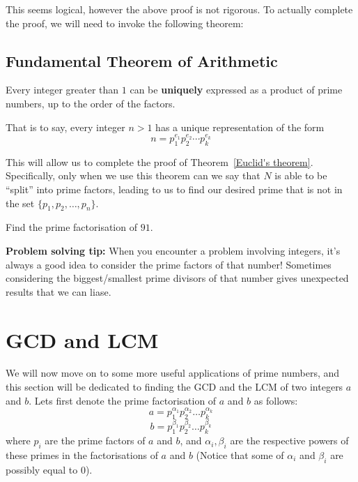 \documentclass{article}
\theoremstyle{mytheoremstyle}
\theoremstyle{mytheoremstyle}
\theoremstyle{myproblemstyle}
\theoremstyle{myproblemstyle}
\theoremstyle{myproblemstyle}
\begin{document}
    This seems logical, however the above proof is not rigorous. To actually complete the proof, we will need to invoke the following theorem:


    
    \subsection{Fundamental Theorem of Arithmetic}
    \begin{theorem}
        Every integer greater than $1$ can be \textbf{uniquely} expressed as a product of prime numbers, up to the order of the factors.
    \end{theorem}

    That is to say, every integer $n > 1$ has a unique representation of the form 
    \begin{equation*}
        n = p_1^{e_1} p_2^{e_2} \cdots p_k^{e_k}
    \end{equation*}

    This will allow us to complete the proof of Theorem~\ref{Euclid's theorem}. Specifically, only when we use this theorem can we say that $N$ is able to be ``split'' into prime factors, leading to us to find our desired prime that is not in the set $\{p_1, p_2, \ldots, p_n\}$.

    \begin{exercise}
        Find the prime factorisation of $91$. 
    \end{exercise}

    \textbf{Problem solving tip:} When you encounter a problem involving integers, it's always a good idea to consider the prime factors of that number! Sometimes considering the biggest/smallest prime divisors of that number gives unexpected results that we can liase.

    \section{GCD and LCM}
    We will now move on to some more useful applications of prime numbers, and this section will be dedicated to finding the GCD and the LCM of two integers $a$ and $b$. 
    Lets first denote the prime factorisation of $a$ and $b$ as follows:
    \[a = p_1^{\alpha_1}p_2^{\alpha_2} \ldots p_k^{\alpha_k}\]
    \[b = p_1^{\beta_1}p_2^{\beta_2} \ldots p_k^{\beta_k}\]
    where $p_i$ are the prime factors of $a$ and $b$, and $\alpha_i, \beta_i$ are the respective powers of these primes in the factorisations of $a$ and $b$ (Notice that some of $\alpha_i$ and $\beta_i$ are possibly equal to $0$).
    
\end{document}
